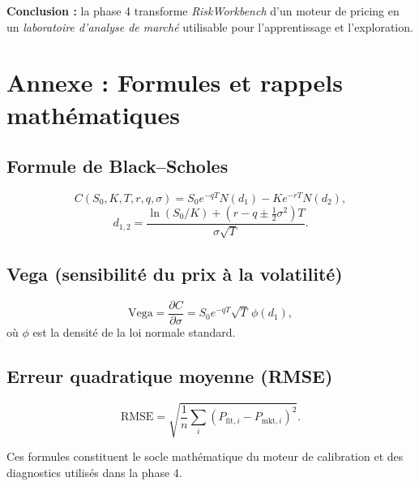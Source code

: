 \documentclass[11pt,a4paper]{article}
\begin{document}
\textbf{Conclusion :} la phase 4 transforme \emph{RiskWorkbench} d’un moteur de pricing en un \emph{laboratoire d’analyse de marché} utilisable pour l’apprentissage et l’exploration.


\clearpage
\section*{Annexe : Formules et rappels mathématiques}

\subsection*{Formule de Black--Scholes}
\[
C(S_0, K, T, r, q, \sigma) = S_0 e^{-qT} N(d_1) - K e^{-rT} N(d_2),
\]
\[
d_{1,2} = \frac{\ln(S_0/K) + (r - q \pm \tfrac{1}{2}\sigma^2)T}{\sigma \sqrt{T}}.
\]

\subsection*{Vega (sensibilité du prix à la volatilité)}
\[
\text{Vega} = \frac{\partial C}{\partial \sigma} = S_0 e^{-qT} \sqrt{T} \, \phi(d_1),
\]
où $\phi$ est la densité de la loi normale standard.

\subsection*{Erreur quadratique moyenne (RMSE)}
\[
\text{RMSE} = \sqrt{\frac{1}{n}\sum_i (P_{\text{fit},i} - P_{\text{mkt},i})^2}.
\]

Ces formules constituent le socle mathématique du moteur de calibration et des diagnostics utilisés dans la phase 4.
\end{document}
